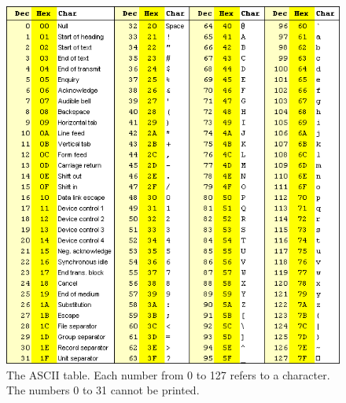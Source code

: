 \documentclass[10pt,a4paper]{article}
\begin{document}
\begin{figure}
\begin{center}
\includegraphics[scale=0.6]{../pictures/ascii}
\caption{The ASCII table. Each number from 0 to 127 refers to a character. The numbers 0 to 31 cannot be printed.}
\label{fig:ascii}
\end{center}
\end{figure}
\end{document}
